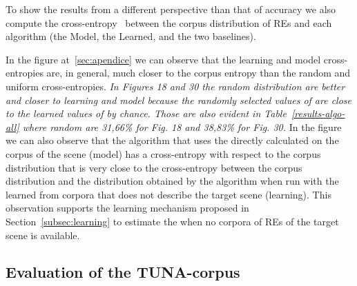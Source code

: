 To show the results from a different perspective than that of accuracy we also compute the cross-entropy~\cite{juraksky:spee08} between the corpus distribution of REs and each algorithm (the Model, the Learned, and the two baselines).    






In the figure at~\ref{sec:apendice} we can observe that the learning and model cross-entropies are, in general, much closer to the corpus entropy than the random and uniform cross-entropies. \textit{In Figures 18 and 30 the random distribution are better and closer to learning and model because the randomly selected values of \puse are close to the learned values of \puse by chance. Those are also evident in Table~\ref{results-algo-all} where random are 31,66\% for Fig. 18 and 38,83\% for Fig. 30.}
In the figure we can also observe that the algorithm that uses the \puse directly calculated on the corpus of the scene (model) has a cross-entropy with respect to the corpus distribution that is very close to the cross-entropy between the corpus distribution and the distribution obtained by the algorithm when run with the \puse learned from corpora that does not describe the target scene (learning). This observation supports the learning mechanism proposed in Section~\ref{subsec:learning} to estimate the \puse when no corpora of REs of the target scene is available. 

\subsection{Evaluation of the TUNA-corpus}

